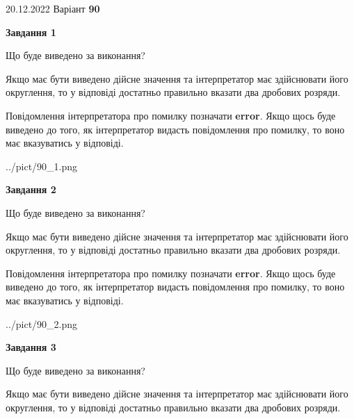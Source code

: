 \documentclass[12pt, ukrainian]{article}
\begin{document}
{20.12.2022 Варіант \No \textbf { 90 }\par}
{
\begin {Large}

{\begin {center}\textbf{Завдання 1}\end {center}}\par
Що буде виведено за виконання? \par

Якщо має бути виведено дійсне значення та інтерпретатор має здійснювати його округлення, 
то у відповіді достатньо правильно вказати два дробових розряди.

Повідомлення інтерпретатора про помилку позначати \textbf{error}.
Якщо щось буде виведено до того, як інтерпретатор видасть повідомлення про помилку, 
то воно має вказуватись у відповіді. \par

\begin{center}
	{../pict/90_1.png}
\end{center}
\newpage

{\begin {center}\textbf{Завдання 2}\end {center}}\par
Що буде виведено за виконання? \par

Якщо має бути виведено дійсне значення та інтерпретатор має здійснювати його округлення, 
то у відповіді достатньо правильно вказати два дробових розряди.

Повідомлення інтерпретатора про помилку позначати \textbf{error}.
Якщо щось буде виведено до того, як інтерпретатор видасть повідомлення про помилку, 
то воно має вказуватись у відповіді. \par

\begin{center}
	{../pict/90_2.png}
\end{center}
\newpage

{\begin {center}\textbf{Завдання 3}\end {center}}\par
Що буде виведено за виконання? \par

Якщо має бути виведено дійсне значення та інтерпретатор має здійснювати його округлення, 
то у відповіді достатньо правильно вказати два дробових розряди.


\end{Large}}
\end{document}
